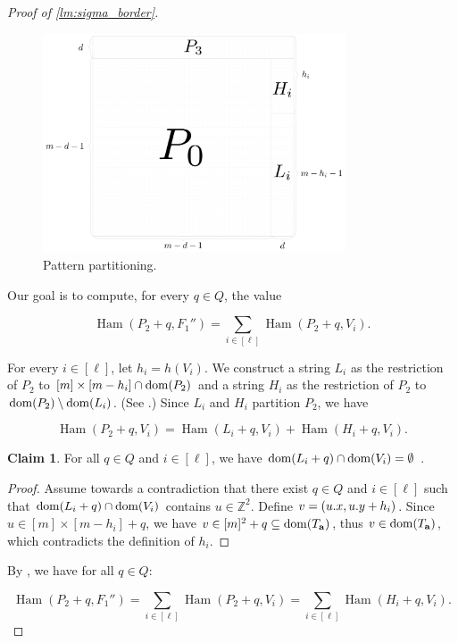\documentclass[11pt, letterpaper]{article}
\theoremstyle{plain}
\theoremstyle{definition}
\newtheorem{claim}{Claim}
\theoremstyle{remark}
\newcommand{\Z}{\mathbb{Z}}
\DeclareMathOperator*{\Ham}{Ham}
\begin{document}
\begin{proof}[{Proof of \cref{lm:sigma_border}}]
\begin{figure}[!t]
	\begin{center}
		\includegraphics[width=0.8\textwidth]{drawings/pattern_restriction}
	\end{center}
	\caption{Pattern partitioning.}
	\label{figure:pattern_restriction}
\end{figure}

Our goal is to compute, for every $q \in Q$, the value

\[ \Ham(P_2 + q, F_1'') = \sum_{i \in [\ell]} \Ham(P_2 + q, V_i).\]

For every $i \in [\ell]$, let $h_i = h(V_i)$. We construct a string $L_i$ as the restriction of $P_2$ to $[m] \times [m - h_i] \cap \operatorname*{dom}(P_2)$ and a string $H_i$ as the restriction of $P_2$ to $\operatorname*{dom}(P_2) \setminus \operatorname*{dom}(L_i)$. (See .) Since $L_i$ and $H_i$ partition $P_2$, we have

\[\Ham(P_2 + q, V_i) = \Ham(L_i + q, V_i) + \Ham(H_i + q, V_i). \]

\begin{claim}\label{pattern_height_reduction}
For all $q \in Q$ and $i \in [\ell]$, we have $\operatorname*{dom}(L_i + q) \cap \operatorname*{dom}(V_i) = \emptyset$ .
\end{claim}
\begin{proof}
Assume towards a contradiction that there exist $q \in Q$ and $i \in [\ell]$ such that $\operatorname*{dom}(L_i + q) \cap \operatorname*{dom}(V_i)$ contains $u \in \Z^2$. Define $v = (u.x, u.y + h_i)$.
Since $u \in [m] \times [m - h_i] + q$, we have $v \in [m]^2 + q \subseteq \operatorname*{dom}(T_\mathbf{a})$, thus $v \in \operatorname*{dom}(T_\mathbf{a})$, which contradicts the definition of $h_i$.
\end{proof}

By , we have for all $q \in Q$:

\[\Ham(P_2 + q, F_1'') = \sum_{i \in [\ell]} \Ham(P_2 + q, V_i) = \sum_{i \in [\ell]} \Ham(H_i + q, V_i). \]


\end{proof}
\end{document}
